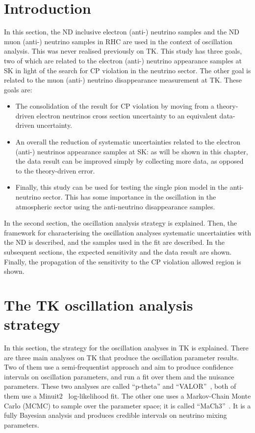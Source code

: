 


\section{Introduction}
\label{sec:banffintroduction}

In this section, the \Gls{ND} inclusive electron (anti-) neutrino
samples and the \Gls{ND} muon (anti-) neutrino samples in \Gls{RHC}
are used in the context of oscillation analysis. This was never
realised previously on \Gls{TK}. This study has three goals, two of
which are related to the electron (anti-) neutrino appearance samples
at \Gls{SK} in light of the search for \Gls{CP} violation in the
neutrino sector. The other goal is related to the muon (anti-)
neutrino disappearance measurement at \Gls{TK}. These goals are:
\begin{itemize}[noitemsep,topsep=0pt]
\item The consolidation of the result for \Gls{CP} violation by moving
  from a theory-driven electron neutrinos cross section uncertainty to
  an equivalent data-driven uncertainty.
\item An overall the reduction of systematic uncertainties related to
  the electron (anti-) neutrinos appearance samples at \Gls{SK}: as
  will be shown in this chapter, the data result can be improved
  simply by collecting more data, as opposed to the theory-driven
  error.
\item Finally, this study can be used for testing the single pion
  model in the anti-neutrino sector. This has some importance in the
  oscillation in the atmospheric sector using the anti-neutrino
  disappearance samples.
\end{itemize}

In the second section, the oscillation analysis strategy is
explained. Then, the framework for characterising the oscillation
analyses systematic uncertainties with the \Gls{ND} is described, and
the samples used in the fit are described. In the subsequent sections,
the expected sensitivity and the data result are shown. Finally, the
propagation of the sensitivity to the \Gls{CP} violation allowed
region is shown.


\section{The TK oscillation analysis strategy}
\label{sec:oscillationanalysis}
In this section, the strategy for the oscillation analyses in \Gls{TK}
is explained. There are three main analyses on \Gls{TK} that produce
the oscillation parameter results. Two of them use a semi-frequentist
approach and aim to produce confidence intervals on oscillation
parameters, and run a fit over them and the nuisance parameters.
These two analyses are called ``\gls{p-theta}'' and
``\Gls{VALOR}''~\cite{VALOR}, both of them use a
Minuit2~\cite{James:1975dr} log-likelihood fit. The other one uses a
Markov-Chain Monte Carlo (\Gls{MCMC}) to sample over the parameter
space; it is called ``\Gls{MaCh3}''~\cite{MACH3}. It is a fully
Bayesian analysis and produces credible intervals on neutrino mixing
parameters.

